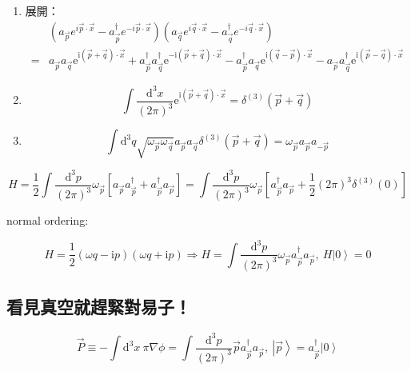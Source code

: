 \documentclass{article}
\begin{document}
\begin{enumerate}
\item 展開：$$
  \begin{aligned}
    & \left(a_{\vec{p}} e^{i \vec{p} \cdot \vec{x}}-a_{\vec{p}}^{\dagger} e^{-i \vec{p} \cdot \vec{x}}\right)\left(a_{\vec{q}} e^{i \vec{q} \cdot \vec{x}}-a_{\vec{q}}^{\dagger} e^{-i \vec{q} \cdot \vec{x}}\right)                                                                                                                                       \\
    = & a_{\vec{p}}a_{\vec{q}}\mathrm{e}^{\mathrm{i}(\vec{p}+\vec{q})\cdot\vec{x}}+a_{\vec{p}}^{\dagger}a_{\vec{q}}^{\dagger}\mathrm{e}^{-\mathrm{i}(\vec{p}+\vec{q})\cdot\vec{x}}-a_{\vec{p}}^{\dagger}a_{\vec{q}}\mathrm{e}^{\mathrm{i}(\vec{q}-\vec{p})\cdot\vec{x}}-a_{\vec{p}}a_{\vec{q}}^{\dagger}\mathrm{e}^{\mathrm{i}(\vec{p}-\vec{q})\cdot\vec{x}}
  \end{aligned}$$
\item $$\int\frac{\mathrm{d}^3x}{(2\pi)^3}\mathrm{e}^{\mathrm{i}(\vec{p}+\vec{q})\cdot\vec{x}}=\delta^{(3)}\left(\vec{p}+\vec{q}\right)$$
\item $$\int\mathrm{d}^3q\sqrt{\omega_{\vec{p}}\omega_{\vec{q}}}a_{\vec{p}}a_{\vec{q}}\delta^{(3)}\left(\vec{p}+\vec{q}\right)=\omega_{\vec{p}}a_{\vec{p}}a_{-\vec{p}}$$
\end{enumerate}

$$H=\frac{1}{2}\int\frac{\mathrm{d}^3p}{(2\pi)^3}\omega_{\vec{p}}\left[a_{\vec{p}}a_{\vec{p}}^{\dagger}+a_{\vec{p}}^{\dagger}a_{\vec{p}}\right]=\int\frac{\mathrm{d}^3p}{(2\pi)^3}\omega_{\vec{p}}\left[a_{\vec{p}}^{\dagger}a_{\vec{p}}+\frac{1}{2}(2\pi)^3\delta^{(3)}(0)\right]$$

normal ordering:

$$H=\frac{1}{2}(\omega q-\mathrm{i}p)(\omega q+\mathrm{i}p)\Rightarrow H=\int\frac{\mathrm{d}^3p}{(2\pi)^3}\omega_{\vec{p}}a_{\vec{p}}^{\dagger}a_{\vec{p}},\ H\left|0\right\rangle=0$$

\subsection{看見真空就趕緊對易子！}

$$\vec{P}\equiv-\int\mathrm{d}^3x\ \pi\nabla\phi=\int\frac{\mathrm{d}^3p}{(2\pi)^3}\vec{p}a_{\vec{p}}^{\dagger}a_{\vec{p}},\ \left|\vec{p}\right\rangle=a_{\vec{p}}^{\dagger}\left|0\right\rangle$$
\end{document}
